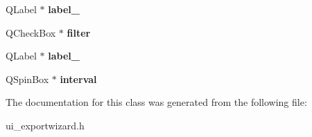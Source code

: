 \begin{DoxyCompactItemize}
\item 
\hypertarget{class_ui___export_wizard_a76cd23500ca5297b24b223d2e621505b}{}Q\+Label $\ast$ {\bfseries label\+\_}\label{class_ui___export_wizard_a76cd23500ca5297b24b223d2e621505b}

\item 
\hypertarget{class_ui___export_wizard_a82ef8a2c3c6442f97f87a6ffe867fe8d}{}Q\+Check\+Box $\ast$ {\bfseries filter}\label{class_ui___export_wizard_a82ef8a2c3c6442f97f87a6ffe867fe8d}

\item 
\hypertarget{class_ui___export_wizard_a4fe8bd1f3aa9afbabad7b72a13601514}{}Q\+Label $\ast$ {\bfseries label\+\_}\label{class_ui___export_wizard_a4fe8bd1f3aa9afbabad7b72a13601514}

\item 
\hypertarget{class_ui___export_wizard_aa5c1133dd13b25d208a93e3d19603b07}{}Q\+Spin\+Box $\ast$ {\bfseries interval}\label{class_ui___export_wizard_aa5c1133dd13b25d208a93e3d19603b07}

\end{DoxyCompactItemize}


The documentation for this class was generated from the following file\+:\begin{DoxyCompactItemize}
\item 
ui\+\_\+exportwizard.\+h\end{DoxyCompactItemize}
